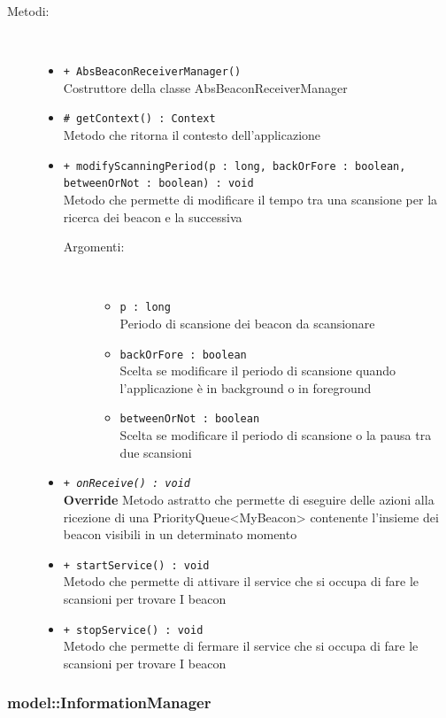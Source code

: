\documentclass[../DefinizioneDiProdotto.tex]{subfiles}
\begin{document}
\begin{description}
\begin{itemize}
\end{itemize}
\item[Metodi:] \
\begin{itemize}
\item \texttt{+ AbsBeaconReceiverManager()}\\
Costruttore della classe AbsBeaconReceiverManager
 \item \texttt{\# getContext() : Context}\\
Metodo che ritorna il contesto dell'applicazione
 \item \texttt{+ modifyScanningPeriod(p : long, backOrFore : boolean, betweenOrNot : boolean) : void}\\
Metodo che permette di modificare il tempo tra una scansione per la ricerca dei beacon e la successiva
 \begin{description}
\item[Argomenti:] \
\begin{itemize}
\item \texttt{p : long}\\
Periodo di scansione dei beacon da scansionare\item \texttt{backOrFore : boolean}\\
Scelta se modificare il periodo di scansione quando l'applicazione è in background o in foreground\item \texttt{betweenOrNot : boolean}\\
Scelta se modificare il periodo di scansione o la pausa tra due scansioni\end{itemize}
\end{description}
\item \texttt{+ \textit{onReceive() : void}}\\
\textbf{Override} Metodo astratto che permette di eseguire delle azioni alla ricezione di una PriorityQueue<MyBeacon> contenente l'insieme dei beacon visibili in un determinato momento
 \item \texttt{+ startService() : void}\\
Metodo che permette di attivare il service che si occupa di fare le scansioni per trovare I beacon
 \item \texttt{+ stopService() : void}\\
Metodo che permette di fermare il service che si occupa di fare le scansioni per trovare I beacon
 \end{itemize}
\end{description}

\subsubsection{model::InformationManager}
\end{document}
